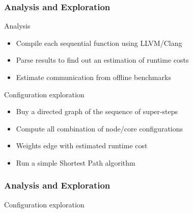 \frame
{
  \frametitle{Analysis and Exploration}
  \begin{block}{Analysis}
  \begin{itemize}
   \footnotesize
   \item Compile each sequential function using LLVM/Clang
   \item Parse results to find out an estimation of runtime costs
   \item Estimate communication from offline benchmarks
  \end{itemize}
  \end{block}{}

  \begin{block}{Configuration exploration}
  \begin{itemize}
   \footnotesize
   \item Buy a directed graph of the sequence of super-steps
   \item Compute all combination of node/core configurations
   \item Weights edge with estimated runtime cost 
   \item Run a simple Shortest Path algorithm
  \end{itemize}
  \end{block}{}
}
\frame
{
  \frametitle{Analysis and Exploration}
    \begin{block}{Configuration exploration}
    \begin{center}\end{center}
    \end{block}{}
}


